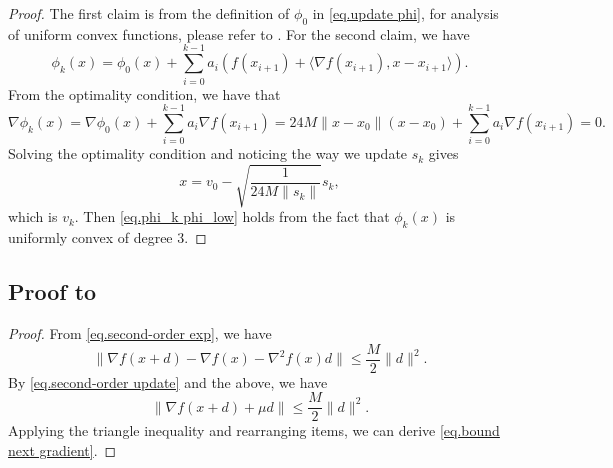 \documentclass{article}
\numberwithin{equation}{section}
\numberwithin{equation}{section}
\begin{document}
\begin{proof}
    The first claim is from the definition of $\phi_0$ in \eqref{eq.update phi}, for analysis of uniform convex functions, please refer to \cite[Section 4.2.2]{nesterov2018lectures}. For the second claim, we have
    \begin{equation}
        \label{eq.phi recursive}
        \phi_k(x) = \phi_0(x)+\sum_{i=0}^{k-1}a_i\left (f(x_{i+1})+\langle \nabla f(x_{i+1}),x-x_{i+1}\rangle \right).
    \end{equation}
    From the optimality condition, we have that
    \begin{equation*}
        \nabla \phi_k(x) = \nabla \phi_0(x)+ \sum_{i=0}^{k-1} a_i\nabla f(x_{i+1}) = 24M\|x-x_0\|(x-x_0)+\sum_{i=0}^{k-1} a_i\nabla f(x_{i+1}) =0.
    \end{equation*}
    Solving the optimality condition and noticing the way we update $s_k$ gives
    \begin{equation*}
        x = v_0 - \sqrt{\frac{1}{24M\|s_{k}\|}}s_{k},
    \end{equation*}
    which is $v_k$. Then \eqref{eq.phi_k phi_low} holds from the fact that $\phi_k(x)$ is uniformly convex of degree 3.
\end{proof}
\subsection*{Proof to~}
\begin{proof}
    From \eqref{eq.second-order exp}, we have
    \begin{equation*}
        \|\nabla f(x+d)- \nabla f(x) -\nabla ^2 f(x) d\| \leq \frac{M}{2}\|d\|^2.
    \end{equation*}
    By \eqref{eq.second-order update} and the above, we have
    \begin{equation}\label{eq.bounded by squared step}
        \|\nabla f(x+d)+\mu d\| \leq \frac{M}{2}\|d\|^2.
    \end{equation}
    Applying the triangle inequality and rearranging items, we can derive \eqref{eq.bound next gradient}.
\end{proof}
\end{document}
